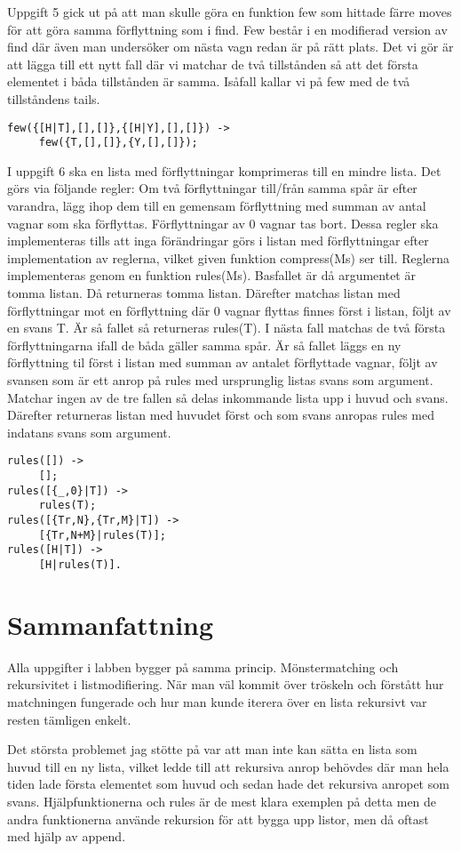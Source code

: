 \documentclass[a4paper, 11pt]{article}
\begin{document}
Uppgift 5 gick ut på att man skulle göra en funktion few som hittade färre moves för att göra samma förflyttning som i find. Few består i en modifierad version av find där även man undersöker om nästa vagn redan är på rätt plats. Det vi gör är att lägga till ett nytt fall där vi matchar de två tillstånden så att det första elementet i båda tillstånden är samma. Isåfall kallar vi på few med de två tillståndens tails.
\begin{verbatim}
few({[H|T],[],[]},{[H|Y],[],[]}) ->
     few({T,[],[]},{Y,[],[]});
\end{verbatim}

I uppgift 6 ska en lista med förflyttningar komprimeras till en mindre lista. Det görs via följande regler: Om två förflyttningar till/från samma spår är efter varandra, lägg ihop dem till en gemensam förflyttning med summan av antal vagnar som ska förflyttas. Förflyttningar av 0 vagnar tas bort. Dessa regler ska implementeras tills att inga förändringar görs i listan med förflyttningar efter implementation av reglerna, vilket given funktion compress(Ms) ser till.
Reglerna implementeras genom en funktion rules(Ms). Basfallet är då argumentet är tomma listan. Då returneras tomma listan. Därefter matchas listan med förflyttningar mot en förflyttning där 0 vagnar flyttas finnes först i listan, följt av en svans T. Är så fallet så returneras rules(T). I nästa fall matchas de två första förflyttningarna ifall de båda gäller samma spår. Är så fallet läggs en ny förflyttning til först i listan med summan av antalet förflyttade vagnar, följt av svansen som är ett anrop på rules med ursprunglig listas svans som argument. Matchar ingen av de tre fallen så delas inkommande lista upp i huvud och svans. Därefter returneras listan med huvudet först och som svans anropas rules med indatans svans som argument.
\begin{verbatim}
rules([]) ->
     [];
rules([{_,0}|T]) ->
     rules(T);
rules([{Tr,N},{Tr,M}|T]) ->
     [{Tr,N+M}|rules(T)];
rules([H|T]) ->
     [H|rules(T)].
\end{verbatim}

\section{Sammanfattning}

Alla uppgifter i labben bygger på samma princip. Mönstermatching och rekursivitet i listmodifiering. När man väl kommit över tröskeln och förstått hur matchningen fungerade och hur man kunde iterera över en lista rekursivt var resten tämligen enkelt.

Det största problemet jag stötte på var att man inte kan sätta en lista som huvud till en ny lista, vilket ledde till att rekursiva anrop behövdes där man hela tiden lade första elementet som huvud och sedan hade det rekursiva anropet som svans. Hjälpfunktionerna och rules är de mest klara exemplen på detta men de andra funktionerna använde rekursion för att bygga upp listor, men då oftast med hjälp av append.
\end{document}
